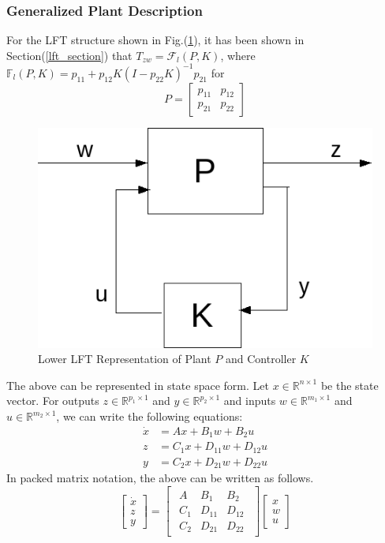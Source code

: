 \documentclass[a4paper,12pt]{article}
\begin{document}
		\subsubsection{Generalized Plant Description}
		For the LFT structure shown in Fig.(\ref{llftpk}), it has been shown in Section(\ref{lft_section}) that $T_{zw} = \mathscr{F}_{l}(P,K)$, where $\mathbb{F}_{l}(P,K) = p_{11}+p_{12}K(I-p_{22}K)^{-1}p_{21}$ for \[ P= \begin{bmatrix}
		p_{11} &p_{12}\\
		p_{21} &p_{22}
		\end{bmatrix}
		\]
		\begin{figure}[H]
			  \centering
			  \includegraphics[scale=0.5]{llftpk}
%			  
			  \caption{Lower LFT Representation of Plant $P$ and Controller $K$}
			 \label{llftpk}
		\end{figure}	
		The above can be represented in state space form. Let $x \in \mathbb{R}^{n \times 1}$ be the state vector. For outputs $z \in \mathbb{R}^{p_{1} \times 1}$ and $y \in \mathbb{R}^{p_{2} \times 1}$ and inputs $w \in \mathbb{R}^{m_{1} \times 1}$ and $u \in \mathbb{R}^{m_{2} \times 1}$, we can write the following equations:
		\begin{align}
		\dot{x} &= Ax + B_{1}w + B_{2}u\\
		z&=C_{1}x+D_{11}w+D_{12}u\\
		y&=C_{2}x+D_{21}w+D_{22}u
		\label{ss1}
		\end{align}
		In packed matrix notation, the above can be written as follows.
		\[
		\begin{bmatrix}
		\dot{x} \\ \hline
		z\\
		y
		\end{bmatrix}
		=
		\begin{bmatrix}
	\begin{array}{c|cc}
	A & B_{1} & B_{2}\\ \hline
	C_{1}
	 & D_{11}
	  & D_{12} \\
	  C_{2} & D_{21} & D_{22}
	\end{array}
	\end{bmatrix}
	\begin{bmatrix}
	x \\ \hline
	w\\u
	\end{bmatrix}
		\]
\end{document}
